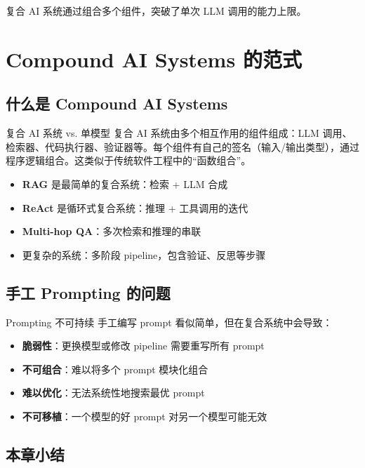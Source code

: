 \documentclass[a4paper]{article}
\begin{document}
复合 AI 系统通过组合多个组件，突破了单次 LLM 调用的能力上限。

\section{Compound AI Systems 的范式}

\subsection{什么是 Compound AI Systems}

\begin{knowledgebox}{复合 AI 系统 vs. 单模型}
复合 AI 系统由多个相互作用的组件组成：LLM 调用、检索器、代码执行器、验证器等。每个组件有自己的签名（输入/输出类型），通过程序逻辑组合。这类似于传统软件工程中的``函数组合''。
\end{knowledgebox}

\begin{itemize}
    \item \textbf{RAG} 是最简单的复合系统：检索 + LLM 合成
    \item \textbf{ReAct} 是循环式复合系统：推理 + 工具调用的迭代
    \item \textbf{Multi-hop QA}：多次检索和推理的串联
    \item 更复杂的系统：多阶段 pipeline，包含验证、反思等步骤
\end{itemize}

\subsection{手工 Prompting 的问题}

\begin{warningbox}{Prompting 不可持续}
手工编写 prompt 看似简单，但在复合系统中会导致：
\begin{itemize}
    \item \textbf{脆弱性}：更换模型或修改 pipeline 需要重写所有 prompt
    \item \textbf{不可组合}：难以将多个 prompt 模块化组合
    \item \textbf{难以优化}：无法系统性地搜索最优 prompt
    \item \textbf{不可移植}：一个模型的好 prompt 对另一个模型可能无效
\end{itemize}
\end{warningbox}

\subsection{本章小结}
\end{document}

